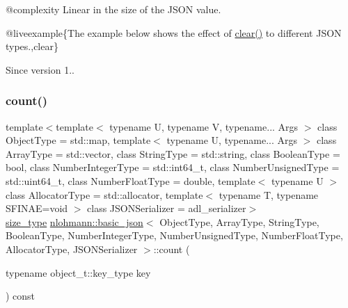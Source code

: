 @complexity Linear in the size of the J\+S\+ON value.

@liveexample\{The example below shows the effect of {\ttfamily \mbox{\hyperlink{classnlohmann_1_1basic__json_abfeba47810ca72f2176419942c4e1952}{clear()}}} to different J\+S\+ON types.,clear\}

\begin{DoxySince}{Since}
version 1.. 
\end{DoxySince}
\mbox{\label{classnlohmann_1_1basic__json_a5261eba9637f59d17d6cab5f14ce5747}} 
\subsubsection{\texorpdfstring{count()}{count()}}
{\footnotesize\ttfamily template$<$template$<$ typename U, typename V, typename... Args $>$ class Object\+Type = std\+::map, template$<$ typename U, typename... Args $>$ class Array\+Type = std\+::vector, class String\+Type  = std\+::string, class Boolean\+Type  = bool, class Number\+Integer\+Type  = std\+::int64\+\_\+t, class Number\+Unsigned\+Type  = std\+::uint64\+\_\+t, class Number\+Float\+Type  = double, template$<$ typename U $>$ class Allocator\+Type = std\+::allocator, template$<$ typename T, typename S\+F\+I\+N\+A\+E=void $>$ class J\+S\+O\+N\+Serializer = adl\+\_\+serializer$>$ \\
\mbox{\hyperlink{classnlohmann_1_1basic__json_a39f2cd0b58106097e0e67bf185cc519b}{size\+\_\+type}} \mbox{\hyperlink{classnlohmann_1_1basic__json}{nlohmann\+::basic\+\_\+json}}$<$ Object\+Type, Array\+Type, String\+Type, Boolean\+Type, Number\+Integer\+Type, Number\+Unsigned\+Type, Number\+Float\+Type, Allocator\+Type, J\+S\+O\+N\+Serializer $>$\+::count (\begin{DoxyParamCaption}\item[{typename object\+\_\+t\+::key\+\_\+type}]{key }\end{DoxyParamCaption}) const\hspace{0.3cm}{\ttfamily [inline]}}



